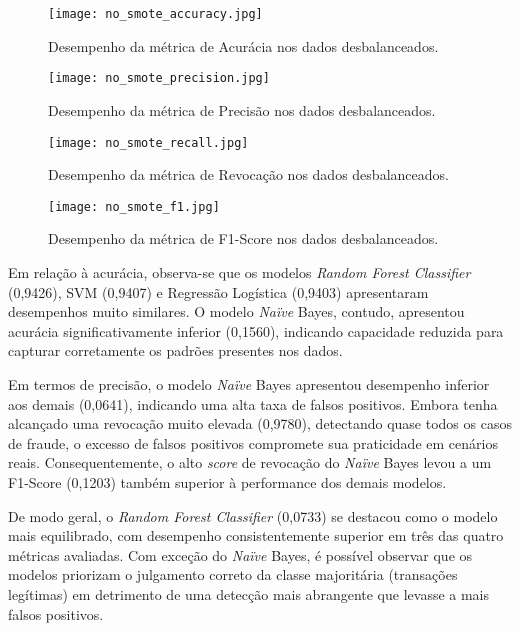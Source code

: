 \documentclass[conference]{IEEEtran}
\begin{document}
\begin{figure}[h]
    \centering
    \texttt{[image: no\_smote\_accuracy.jpg]}
    \caption{Desempenho da métrica de Acurácia nos dados desbalanceados.}
    \label{fig:accuracy_no_smote}
\end{figure}

\begin{figure}[h]
    \centering
    \texttt{[image: no\_smote\_precision.jpg]}
    \caption{Desempenho da métrica de Precisão nos dados desbalanceados.}
    \label{fig:precision_no_smote}
\end{figure}

\begin{figure}[h]
    \centering
    \texttt{[image: no\_smote\_recall.jpg]}
    \caption{Desempenho da métrica de Revocação nos dados desbalanceados.}
    \label{fig:recall_no_smote}
\end{figure}

\begin{figure}[ht]
    \centering
    \texttt{[image: no\_smote\_f1.jpg]}
    \caption{Desempenho da métrica de F1-Score nos dados desbalanceados.}
    \label{fig:f1_no_smote}
\end{figure}


Em relação à acurácia, observa-se que os modelos \textit{Random Forest Classifier} (0,9426), SVM (0,9407) e Regressão Logística (0,9403) apresentaram desempenhos muito similares. O modelo \textit{Naïve} Bayes, contudo, apresentou acurácia significativamente inferior (0,1560), indicando capacidade reduzida para capturar corretamente os padrões presentes nos dados. 

Em termos de precisão, o modelo \textit{Naïve} Bayes apresentou desempenho inferior aos demais (0,0641), indicando uma alta taxa de falsos positivos. Embora tenha alcançado uma revocação muito elevada (0,9780), detectando quase todos os casos de fraude, o excesso de falsos positivos compromete sua praticidade em cenários reais. Consequentemente, o alto \textit{score} de revocação do \textit{Naïve} Bayes levou a um F1-Score (0,1203) também superior à performance dos demais modelos. 

De modo geral, o  \textit{Random Forest Classifier} (0,0733) se destacou como o modelo mais equilibrado, com desempenho consistentemente superior em três das quatro métricas avaliadas. Com exceção do \textit{Naïve} Bayes, é possível observar que os modelos priorizam o julgamento correto da classe majoritária (transações legítimas) em detrimento de uma detecção mais abrangente que levasse a mais falsos positivos.
\end{document}
